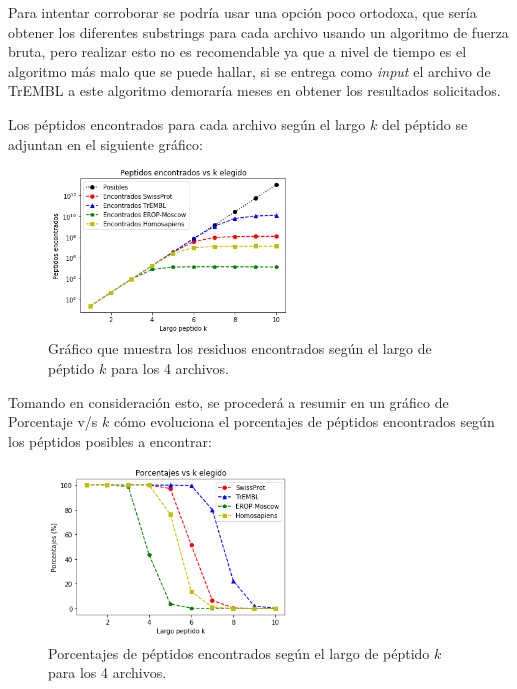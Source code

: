 Para intentar corroborar se podría usar una opción poco ortodoxa, que sería obtener los diferentes substrings para cada archivo usando un algoritmo de fuerza bruta, pero realizar esto no es recomendable ya que a nivel de tiempo es el algoritmo más malo que se puede hallar, si se entrega como \textit{input} el archivo de TrEMBL a este algoritmo demoraría meses en obtener los resultados solicitados.

Los péptidos encontrados para cada archivo según el largo $k$ del péptido se adjuntan en el siguiente gráfico:

\begin{figure}[h]
    \centering
    \includegraphics[width=0.6\textwidth]{./images/todosv1.png}
    \caption{Gráfico que muestra los residuos encontrados según el largo de péptido $k$ para los 4 archivos.}
    \label{fig:todos}
\end{figure}

Tomando en consideración esto, se procederá a resumir en un gráfico de Porcentaje v/s $k$ cómo evoluciona el porcentajes de péptidos encontrados según los péptidos posibles a encontrar:

\begin{figure}[h]
    \centering
    \includegraphics[width=0.6\textwidth]{./images/grafico1v1.png}
    \caption{Porcentajes de péptidos encontrados según el largo de péptido $k$ para los 4 archivos.}
    \label{fig:imple2}
\end{figure}

